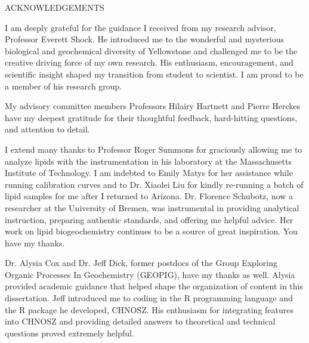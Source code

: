 \begin{center}
    \doublespace
    ACKNOWLEDGEMENTS
\end{center}

I am deeply grateful for the guidance I received from my research advisor, Professor Everett Shock. He introduced me to the wonderful and mysterious biological and geochemical diversity of Yellowstone and challenged me to be the creative driving force of my own research. His enthusiasm, encouragement, and scientific insight shaped my transition from student to scientist. I am proud to be a member of his research group.

My advisory committee members Professors Hilairy Hartnett and Pierre Herckes have my deepest gratitude for their thoughtful feedback, hard-hitting questions, and attention to detail.

I extend many thanks to Professor Roger Summons for graciously allowing me to analyze lipids with the instrumentation in his laboratory at the Massachusetts Institute of Technology. I am indebted to Emily Matys for her assistance while running calibration curves and to Dr. Xiaolei Liu for kindly re-running a batch of lipid samples for me after I returned to Arizona. Dr. Florence Schubotz, now a researcher at the University of Bremen, was instrumental in providing analytical instruction, preparing authentic standards, and offering me helpful advice. Her work on lipid biogeochemistry continues to be a source of great inspiration. You have my thanks.

Dr. Alysia Cox and Dr. Jeff Dick, former postdocs of the Group Exploring Organic Processes In Geochemistry (GEOPIG), have my thanks as well. Alysia provided academic guidance that helped shape the organization of content in this dissertation. Jeff introduced me to coding in the R programming language and the R package he developed, CHNOSZ. His enthusiasm for integrating features into CHNOSZ and providing detailed answers to theoretical and technical questions proved extremely helpful.

